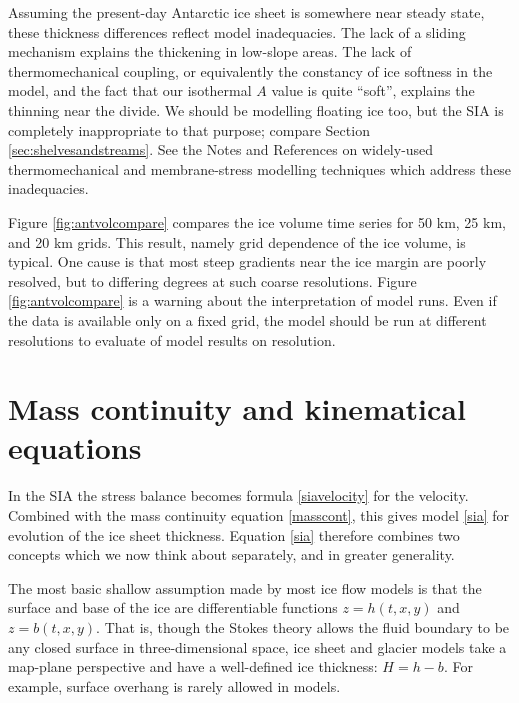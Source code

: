 \documentclass[letterpaper,final,12pt,reqno]{amsart}
\begin{document}
Assuming the present-day Antarctic ice sheet is somewhere near steady state, these thickness differences reflect model inadequacies.  The lack of a sliding mechanism explains the thickening in low-slope areas.  The lack of thermomechanical coupling, or equivalently the constancy of ice softness in the model, and the fact that our isothermal $A$ value is quite ``soft'', explains the thinning near the divide.  We should be modelling floating ice too, but the SIA is completely inappropriate to that purpose; compare Section \ref{sec:shelvesandstreams}.  See the Notes and References on widely-used thermomechanical and membrane-stress modelling techniques which address these inadequacies.

Figure \ref{fig:antvolcompare} compares the ice volume time series for 50 km, 25 km, and 20 km grids.  This result, namely grid dependence of the ice volume, is typical.  One cause is that most steep gradients near the ice margin are poorly resolved, but to differing degrees at such coarse resolutions.  Figure \ref{fig:antvolcompare} is a warning about the interpretation of model runs.  Even if the data is available only on a fixed grid, the model should be run at different resolutions to evaluate  of model results on resolution.


\section{Mass continuity and kinematical equations}   \label{sec:masscont}

In the SIA the stress balance becomes formula \eqref{siavelocity} for the velocity.  Combined with the mass continuity equation \eqref{masscont}, this gives model \eqref{sia} for evolution of the ice sheet thickness.  Equation \eqref{sia} therefore combines two concepts which we now think about separately, and in greater generality.

The most basic shallow assumption made by most ice flow models is that the surface and base of the ice are differentiable functions $z=h(t,x,y)$ and $z=b(t,x,y)$.  That is, though the Stokes theory allows the fluid boundary to be any closed surface in three-dimensional space, ice sheet and glacier models take a map-plane perspective and have a well-defined ice thickness: $H=h-b$.  For example, surface overhang is rarely allowed in models.
\end{document}

